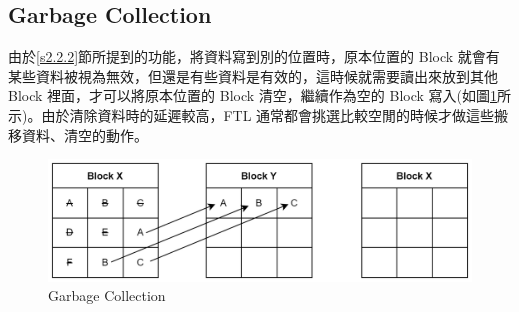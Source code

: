 \subsection{Garbage Collection}\label{s2.2.3}
\indent
由於\ref{s2.2.2}節所提到的功能，將資料寫到別的位置時，原本位置的 Block 就會有某些資料被視為無效，但還是有些資料是有效的，這時候就需要讀出來放到其他 Block 裡面，才可以將原本位置的 Block 清空，繼續作為空的 Block 寫入(如圖\ref{f2.7}所示)。由於清除資料時的延遲較高，FTL 通常都會挑選比較空閒的時候才做這些搬移資料、清空的動作。\cite{BUX20101172}
\begin{figure}[H]
    \centering
    \includegraphics[width=1\textwidth]{picture/ch2/garbage_collection.png}
    \caption{Garbage Collection\cite{Garbage_Collection}}
    \label{f2.7}
\end{figure}

